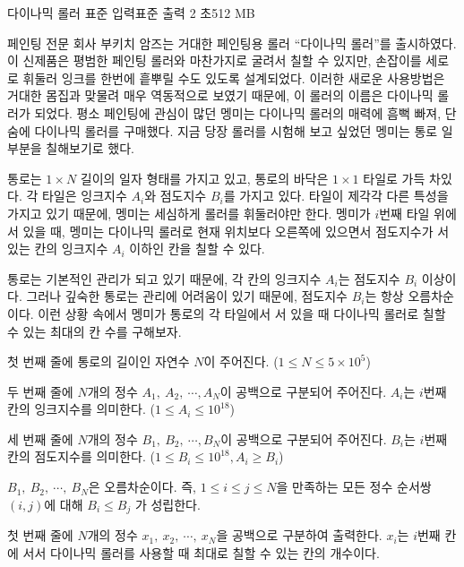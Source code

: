 \begin{problem}{다이나믹 롤러}
    {표준 입력}{표준 출력}
    {2 초}{512 MB}{}
    
    페인팅 전문 회사 부키치 암즈는 거대한 페인팅용 롤러 ``다이나믹 롤러''를 출시하였다. 이 신제품은 평범한 페인팅 롤러와 마찬가지로 굴려서 칠할 수 있지만, 손잡이를 세로로 휘둘러 잉크를 한번에 흩뿌릴 수도 있도록 설계되었다. 이러한 새로운 사용방법은 거대한 몸집과 맞물려 매우 역동적으로 보였기 때문에, 이 롤러의 이름은 다이나믹 롤러가 되었다. 평소 페인팅에 관심이 많던 멩미는 다이나믹 롤러의 매력에 흠뻑 빠져, 단숨에 다이나믹 롤러를 구매했다. 지금 당장 롤러를 시험해 보고 싶었던 멩미는 통로 일부분을 칠해보기로 했다.
    
    통로는 $ 1 \times N $ 길이의 일자 형태를 가지고 있고, 통로의 바닥은 $ 1 \times 1 $ 타일로 가득 차있다. 각 타일은 잉크지수 $ A_i $와 점도지수 $ B_i $를 가지고 있다. 타일이 제각각 다른 특성을 가지고 있기 때문에, 멩미는 세심하게 롤러를 휘둘러야만 한다. 멩미가 $ i $번째 타일 위에 서 있을 때, 멩미는 다이나믹 롤러로 현재 위치보다 오른쪽에 있으면서 점도지수가 서 있는 칸의 잉크지수 $ A_i $ 이하인 칸을 칠할 수 있다.
    
    통로는 기본적인 관리가 되고 있기 때문에, 각 칸의 잉크지수 $ A_i $는 점도지수 $ B_i $ 이상이다. 그러나 깊숙한 통로는 관리에 어려움이 있기 때문에, 점도지수 $ B_i $는 항상 오름차순이다. 이런 상황 속에서 멩미가 통로의 각 타일에서 서 있을 때 다이나믹 롤러로 칠할 수 있는 최대의 칸 수를 구해보자.

    \InputFile

    첫 번째 줄에 통로의 길이인 자연수 $ N $이 주어진다. ($ 1 \leq N \leq 5 \times 10^5 $)
    
    두 번째 줄에 $ N $개의 정수 $ A_1,\ A_2 ,\ \cdots, A_N $이 공백으로 구분되어 주어진다. $ A_i $는 $ i $번째 칸의 잉크지수를 의미한다. ($ 1 \leq A_i \leq 10^{18} $)
    
    세 번째 줄에 $ N $개의 정수 $ B_1,\ B_2,\ \cdots, B_N $이 공백으로 구분되어 주어진다. $ B_i $는 $ i $번째 칸의 점도지수를 의미한다. ($ 1 \leq B_i \leq 10^{18}, A_i \geq B_i $)
    
    $ B_1,\ B_2,\ \cdots,\ B_N $은 오름차순이다. 즉, $ 1 \leq i \leq j \leq N $을 만족하는 모든 정수 순서쌍 $ (i, j) $에 대해 $ B_i \leq B_j $ 가 성립한다.
    
    
    
    \OutputFile
    첫 번째 줄에 $ N $개의 정수 $ x_1,\ x_2,\ \cdots,\ x_N $을 공백으로 구분하여 출력한다. $ x_i $는 $ i $번째 칸에 서서 다이나믹 롤러를 사용할 때 최대로 칠할 수 있는 칸의 개수이다.
    

\end{problem}
